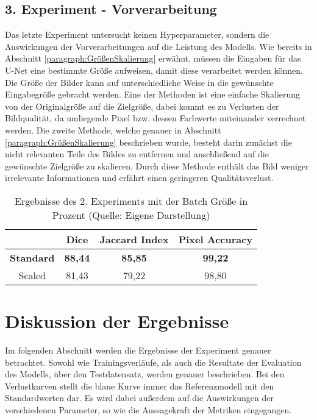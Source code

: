 \subsection{3. Experiment - Vorverarbeitung}
\label{subsec:3.Experiment-Vorverarbeitung}
Das letzte Experiment untersucht keinen Hyperparameter, sondern die Auswirkungen der Vorverarbeitungen auf die Leistung des \gls{Modell}s. Wie bereits in Abschnitt \ref{paragraph:GrößenSkalierung} erwähnt, müssen die Eingaben für das U-Net eine bestimmte Größe aufweisen, damit diese verarbeitet werden können. Die Größe der Bilder kann auf unterschiedliche Weise in die gewünschte Eingabegröße gebracht werden. Eine der Methoden ist eine einfache Skalierung von der Originalgröße auf die Zielgröße, dabei kommt es zu Verlusten der Bildqualität, da umliegende Pixel bzw. dessen Farbwerte miteinander verrechnet werden. Die zweite Methode, welche genauer in Abschnitt \ref{paragraph:GrößenSkalierung} beschrieben wurde, besteht darin zunächst die nicht relevanten Teile des Bildes zu entfernen und anschließend auf die gewünschte Zielgröße zu skalieren. Durch diese Methode enthält das Bild weniger irrelevante Informationen und erfährt einen geringeren Qualitätsverlust. 
\begin{table}[!h]
	\centering
	\begin{tabular}{|c|c|c|c|}
		\hline
		& Dice & Jaccard Index & Pixel Accuracy \\
		\hline
		\textbf{Standard}& \textbf{88,44} 	& \textbf{85,85}  	& \textbf{99,22}  \\
		\hline
		Scaled		& 81,43  	& 79,22 	& 98,80 \\
		\hline
	\end{tabular}
	\caption{Ergebnisse des 2. Experiments mit der Batch Größe in Prozent (Quelle: Eigene Darstellung)}
	\label{table:3.ExperimentErgebnisse}
\end{table}

\section{Diskussion der Ergebnisse}
Im folgenden Abschnitt werden die Ergebnisse der Experiment genauer betrachtet. Sowohl wie Trainingsverläufe, als auch die Resultate der Evaluation des \gls{Modell}s, über den Testdatensatz, werden genauer beschrieben. Bei den Verlustkurven stellt die blaue Kurve immer das Referenzmodell mit den Standardwerten dar. Es wird dabei außerdem auf die Auswirkungen der verschiedenen Parameter, so wie die Aussagekraft der Metriken eingegangen. 

